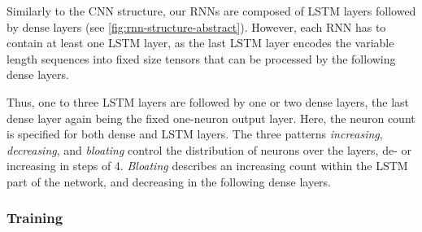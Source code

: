 Similarly to the \gls{CNN} structure, our \glspl{RNN} are composed of \gls{LSTM} layers followed by dense layers (see \ref{fig:rnn-structure-abstract}). However, each \gls{RNN} has to contain at least one \gls{LSTM} layer, as the last \gls{LSTM} layer encodes the variable length sequences into fixed size tensors that can be processed by the following dense layers.

Thus, one to three \gls{LSTM} layers are followed by one or two dense layers, the last dense layer again being the fixed one-neuron output layer. Here, the neuron count is specified for both dense and \gls{LSTM} layers. The three patterns \textit{increasing}, \textit{decreasing}, and \textit{bloating} control the distribution of neurons over the layers, de- or increasing in steps of 4. \textit{Bloating} describes an increasing count within the \gls{LSTM} part of the network, and decreasing in the following dense layers.

\subsubsection{Training}

